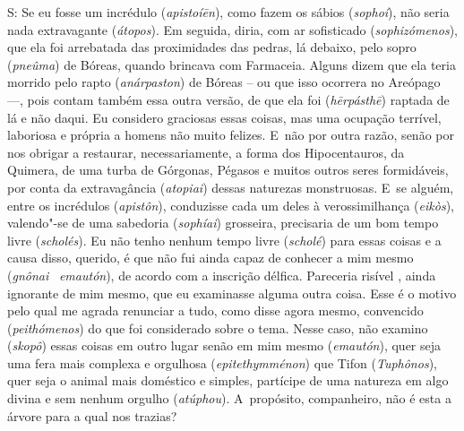 S: Se eu fosse um incrédulo (\emph{apistoíēn}), como fazem os sábios
(\emph{sophoí}), não seria nada extravagante (\emph{átopos}). Em
seguida, diria, com ar sofisticado (\emph{sophizómenos}), que ela foi
arrebatada das proximidades das pedras, lá debaixo, pelo sopro
(\emph{pneûma}) de Bóreas, quando brincava com Farmaceia. Alguns dizem
que ela teria morrido pelo rapto (\emph{anárpaston}) de Bóreas -- ou que
isso ocorrera no Areópago \mbox{---,} \bekker{[229d]} pois contam também essa outra
versão, de que ela foi (\emph{hērpásthē}) raptada de lá e não daqui. Eu
considero graciosas essas coisas, mas uma ocupação terrível, laboriosa e
própria a homens não muito felizes. E~não por outra razão, senão por nos
obrigar a restaurar, necessariamente, a forma dos Hipocentauros, da
Quimera, de uma turba de Górgonas, Pégasos e muitos \bekker{[229e]} outros
seres formidáveis, por conta da extravagância (\emph{atopiai}) dessas
naturezas monstruosas. E~se alguém, entre os incrédulos
(\emph{apistôn}), conduzisse cada um deles à verossimilhança
(\emph{eikòs}), valendo"-se de uma sabedoria (\emph{sophíai}) grosseira,
precisaria de um bom tempo livre (\emph{scholés}). Eu não tenho nenhum
tempo livre (\emph{scholé}) para essas coisas e a causa disso, querido,
é que não fui ainda capaz de conhecer a mim mesmo (\emph{gnônai}~
\emph{emautón}), de acordo com a inscrição délfica. Pareceria risível \bekker{[230a]}, ainda
ignorante de mim mesmo, que eu examinasse alguma outra coisa. Esse é o
motivo pelo qual me agrada renunciar a tudo, como disse agora mesmo,
convencido (\emph{peithómenos}) do que foi considerado sobre o tema.
Nesse caso, não examino (\emph{skopô}) essas coisas em outro lugar senão
em mim mesmo (\emph{emautón}), quer seja uma fera mais complexa e
orgulhosa (\emph{epitethymménon}) que Tifon (\emph{Tuphônos}), quer seja o animal mais doméstico e simples,
partícipe de uma natureza em algo divina e sem nenhum orgulho
(\emph{atúphou}). A~propósito, companheiro, não é esta a árvore para a
qual nos trazias?

